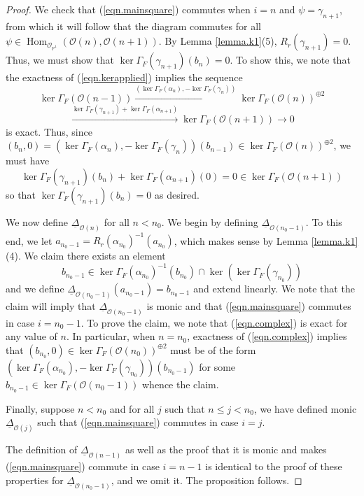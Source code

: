 \documentclass[10pt]{amsart}
\theoremstyle{definition}
\theoremstyle{remark}
\numberwithin{equation}{section}
\begin{document}
\begin{proof}
We check that (\ref{eqn.mainsquare}) commutes when $i=n$ and $\psi=\gamma_{n+1}$, from which it will follow that the diagram commutes for all $\psi \in \operatorname{Hom}_{\mathcal{O}_{\mathbb{P}^{1}}}(\mathcal{O}(n),\mathcal{O}(n+1))$.  By Lemma \ref{lemma.k1}(5), $R_{r}(\gamma_{n+1})=0$.  Thus, we must show that ${\operatorname{ker }\Gamma_{F}}(\gamma_{n+1})(b_{n})=0$.  To show this, we note that the exactness of (\ref{eqn.kerapplied}) implies the sequence
\begin{equation} \label{eqn.complex}
{\operatorname{ker }\Gamma_{F}} (\mathcal{O}(n-1)) \overset{({\operatorname{ker }\Gamma_{F}}(\alpha_{n}),-{\operatorname{ker }\Gamma_{F}}(\gamma_{n}))}{\longrightarrow} {\operatorname{ker }\Gamma_{F}} (\mathcal{O}(n))^{\oplus 2}
\end{equation}
$$
\overset{{\operatorname{ker }\Gamma_{F}}(\gamma_{n+1})+{\operatorname{ker }\Gamma_{F}}(\alpha_{n+1})}{\longrightarrow} {\operatorname{ker }\Gamma_{F}} (\mathcal{O}(n+1)) \rightarrow 0
$$
is exact.  Thus, since $(b_{n},0)=({\operatorname{ker }\Gamma_{F}}(\alpha_{n}),-{\operatorname{ker }\Gamma_{F}}(\gamma_{n}))(b_{n-1}) \in {\operatorname{ker }\Gamma_{F}} (\mathcal{O}(n))^{\oplus 2}$, we must have
$$
{\operatorname{ker }\Gamma_{F}}(\gamma_{n+1})(b_{n})+{\operatorname{ker }\Gamma_{F}}(\alpha_{n+1})(0)=0 \in {\operatorname{ker }\Gamma_{F}} (\mathcal{O}(n+1))
$$
so that ${\operatorname{ker }\Gamma_{F}}(\gamma_{n+1})(b_{n})=0$ as desired.

We now define $\underline{\Delta}_{\mathcal{O}(n)}$ for all $n<n_{0}$.  We begin by defining $\underline{\Delta}_{\mathcal{O}(n_{0}-1)}$.  To this end, we let $a_{n_{0}-1}=R_{r}(\alpha_{n_{0}})^{-1}(a_{n_{0}})$, which makes sense by Lemma \ref{lemma.k1}(4).  We claim there exists an element
$$
b_{n_{0}-1} \in {\operatorname{ker }\Gamma_{F}}(\alpha_{n_{0}})^{-1}(b_{n_{0}}) \cap \operatorname{ker }({\operatorname{ker }\Gamma_{F}} (\gamma_{n_{0}}))
$$
and we define $\underline{\Delta}_{\mathcal{O}(n_{0}-1)}(a_{n_{0}-1})=b_{n_{0}-1}$ and extend linearly.  We note that the claim will imply that $\underline{\Delta}_{\mathcal{O}(n_{0}-1)}$ is monic and that (\ref{eqn.mainsquare}) commutes in case $i=n_{0}-1$.  To prove the claim, we note that (\ref{eqn.complex}) is exact for any value of $n$.  In particular, when $n=n_{0}$, exactness of (\ref{eqn.complex}) implies that $(b_{n_{0}},0) \in  {\operatorname{ker }\Gamma_{F}} (\mathcal{O}(n_{0}))^{\oplus 2}$ must be of the form $({\operatorname{ker }\Gamma_{F}}(\alpha_{n_{0}}),-{\operatorname{ker }\Gamma_{F}}(\gamma_{n_{0}}))(b_{n_{0}-1})$ for some $b_{n_{0}-1} \in {\operatorname{ker }\Gamma_{F}} (\mathcal{O}(n_{0}-1))$ whence the claim.

Finally, suppose $n<n_{0}$ and for all $j$ such that $n \leq j < n_{0}$, we have defined monic $\underline{\Delta}_{\mathcal{O}(j)}$ such that (\ref{eqn.mainsquare}) commutes in case $i=j$.

The definition of $\underline{\Delta}_{\mathcal{O}(n-1)}$ as well as the proof that it is monic and makes (\ref{eqn.mainsquare}) commute in case $i=n-1$ is identical to the proof of these properties for $\underline{\Delta}_{\mathcal{O}(n_{0}-1)}$, and we omit it.  The proposition follows.
\end{proof}
\end{document}
